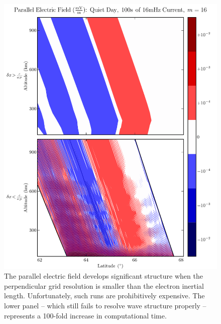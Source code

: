 \begin{figure}[H]
    \centering
    \includegraphics[width=\textwidth]{figures/Ez_inertial_length.pdf}
    \caption[Parallel Electric Fields by Perpendicular Grid Resolution]{
      The parallel electric field develops significant structure when the perpendicular grid resolution is smaller than the electron inertial length. Unfortunately, such runs are prohibitively expensive. The lower panel -- which still fails to resolve wave structure properly -- represents a 100-fold increase in computational time. 
    }
    \label{fig_Ez_inertial_length}
\end{figure}



